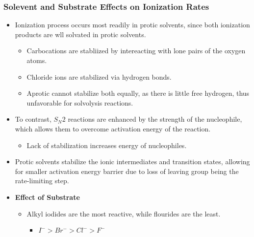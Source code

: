 \documentclass[12pt,a4paper]{article}
\begin{document}
    \subsubsection{Solevent and Substrate Effects on Ionization Rates}
    \begin{itemize}
        \item Ionization process occurs most readily in {\color{o-Sun}protic solvents}, since both ionization products are wll solvated in protic solvents.
            \begin{itemize}
                \item Carbocations are stabliized by intereacting with lone pairs of the oxygen atoms.
                \item Chloride ions are stabilized via hydrogen bonds.
                \item Aprotic cannot stabilize both equally, as there is little free hydrogen, thus unfavorable for solvolysis reactions.
            \end{itemize}
        \item To contrast, \(S_N2\) reactions are enhanced by the {\color{o-Sun}strength of the nucleophile}, which allows them to overcome activation energy of the reaction.
            \begin{itemize}
                \item Lack of stabilization increases energy of nucleophiles.
            \end{itemize}
        \item Protic solvents stabilize the ionic intermediates and transition states, allowing for smaller activation energy barrier due to loss of leaving group being the rate-limiting step.
        \item \textbf{Effect of Substrate}
            \begin{itemize}
                \item Alkyl iodides are the most reactive, while flourides are the least.
                    \begin{itemize}
                        \item \(I^->Br^->Cl^->F^-\)
                    \end{itemize}
            \end{itemize}
    \end{itemize}
\end{document}
